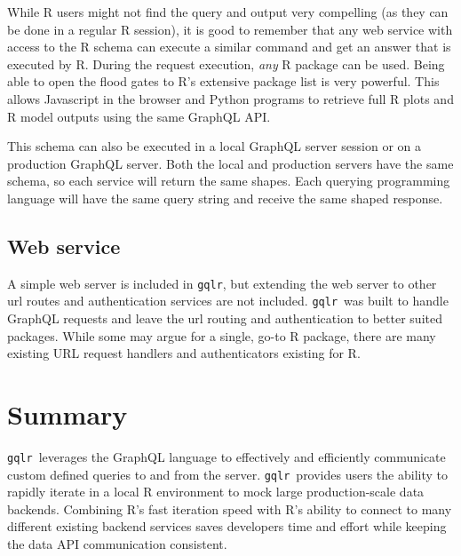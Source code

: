 \documentclass[stat,dissertation]{puthesis}\usepackage[]{graphicx}\usepackage{xcolor}
\newcommand{\pkg}[1]{\texttt{#1}}
\newcommand{\gqlr}{\pkg{gqlr}}
\begin{document}
While R users might not find the query and output very compelling (as they can be done in a regular R session), it is good to remember that any web service with access to the R  schema can execute a similar command and get an answer that is executed by R.  During the request execution, \emph{any} R package can be used.  Being able to open the flood gates to R's extensive package list is very powerful. This allows Javascript in the browser and Python programs to retrieve full R plots and R model outputs using the same GraphQL API.

This schema can also be executed in a local GraphQL server session or on a production GraphQL server.  Both the local and production servers have the same schema, so each service will return the same shapes.  Each querying programming language will have the same query string and receive the same shaped response.


\subsection{Web service}

A simple web server is included in \gqlr, but extending the web server to other url routes and authentication services are not included.  \gqlr~was built to handle GraphQL requests and leave the url routing and authentication to better suited packages.  While some may argue for a single, go-to R package, there are many existing URL request handlers and authenticators existing for R.




\section{Summary}

  \gqlr~leverages the GraphQL language to effectively and efficiently communicate custom defined queries to and from the server.  \gqlr~provides users the ability to rapidly iterate in a local R environment to mock large production-scale data backends.  Combining R's fast iteration speed with R's ability to connect to many different existing backend services saves developers time and effort while keeping the data API communication consistent.






\end{document}
